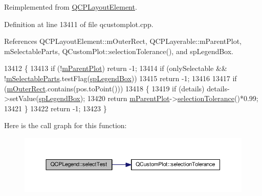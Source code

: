 Reimplemented from \hyperlink{class_q_c_p_layout_element_a9fcf5d0ea19f2c23b2b528bce2c6f095}{Q\+C\+P\+Layout\+Element}.



Definition at line 13411 of file qcustomplot.\+cpp.



References Q\+C\+P\+Layout\+Element\+::m\+Outer\+Rect, Q\+C\+P\+Layerable\+::m\+Parent\+Plot, m\+Selectable\+Parts, Q\+Custom\+Plot\+::selection\+Tolerance(), and sp\+Legend\+Box.


\begin{DoxyCode}
13412 \{
13413   \textcolor{keywordflow}{if} (!\hyperlink{class_q_c_p_layerable_aa2a528433e44db02b8aef23c1f9f90ed}{mParentPlot}) \textcolor{keywordflow}{return} -1;
13414   \textcolor{keywordflow}{if} (onlySelectable && !\hyperlink{class_q_c_p_legend_a179b4d5c1bea723b76e402ff48f0d7fb}{mSelectableParts}.testFlag(\hyperlink{class_q_c_p_legend_a5404de8bc1e4a994ca4ae69e2c7072f1a0fa4758962a46fa1dc9da818abae23c4}{spLegendBox}))
13415     \textcolor{keywordflow}{return} -1;
13416   
13417   \textcolor{keywordflow}{if} (\hyperlink{class_q_c_p_layout_element_a07bb4973379e75cb0fa5b032c1d24afd}{mOuterRect}.contains(pos.toPoint()))
13418   \{
13419     \textcolor{keywordflow}{if} (details) details->setValue(\hyperlink{class_q_c_p_legend_a5404de8bc1e4a994ca4ae69e2c7072f1a0fa4758962a46fa1dc9da818abae23c4}{spLegendBox});
13420     \textcolor{keywordflow}{return} \hyperlink{class_q_c_p_layerable_aa2a528433e44db02b8aef23c1f9f90ed}{mParentPlot}->\hyperlink{class_q_custom_plot_a7b738074c75e80070ef6a10263c6cd69}{selectionTolerance}()*0.99;
13421   \}
13422   \textcolor{keywordflow}{return} -1;
13423 \}
\end{DoxyCode}


Here is the call graph for this function\+:\nopagebreak
\begin{figure}[H]
\begin{center}
\leavevmode
\includegraphics[width=350pt]{class_q_c_p_legend_aa3892801051bc7b985e003576df844db_cgraph}
\end{center}
\end{figure}


\hypertarget{class_q_c_p_legend_a866a9e3f5267de7430a6c7f26a61db9f}{}
